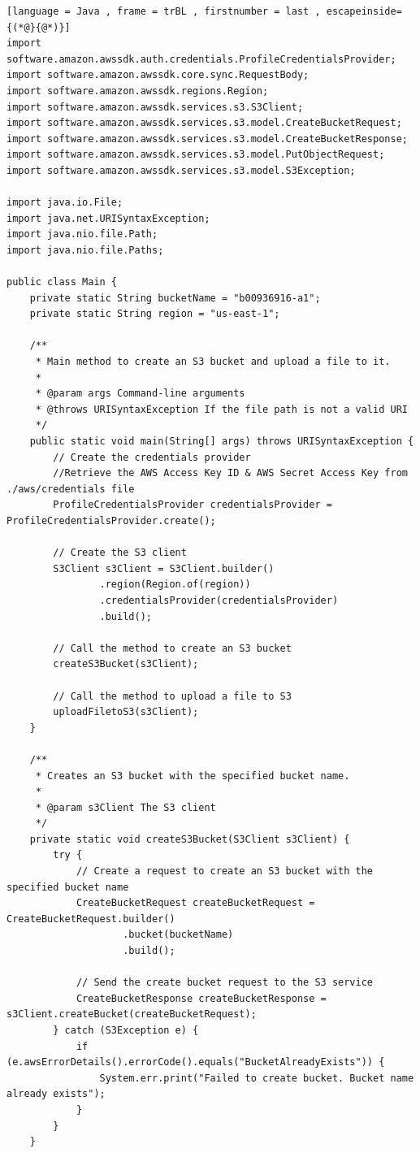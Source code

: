 \begin{itemize}
\begin{lstlisting}[language = Java , frame = trBL , firstnumber = last , escapeinside={(*@}{@*)}]
import software.amazon.awssdk.auth.credentials.ProfileCredentialsProvider;
import software.amazon.awssdk.core.sync.RequestBody;
import software.amazon.awssdk.regions.Region;
import software.amazon.awssdk.services.s3.S3Client;
import software.amazon.awssdk.services.s3.model.CreateBucketRequest;
import software.amazon.awssdk.services.s3.model.CreateBucketResponse;
import software.amazon.awssdk.services.s3.model.PutObjectRequest;
import software.amazon.awssdk.services.s3.model.S3Exception;

import java.io.File;
import java.net.URISyntaxException;
import java.nio.file.Path;
import java.nio.file.Paths;

public class Main {
    private static String bucketName = "b00936916-a1";
    private static String region = "us-east-1";

    /**
     * Main method to create an S3 bucket and upload a file to it.
     *
     * @param args Command-line arguments
     * @throws URISyntaxException If the file path is not a valid URI
     */
    public static void main(String[] args) throws URISyntaxException {
        // Create the credentials provider
        //Retrieve the AWS Access Key ID & AWS Secret Access Key from ./aws/credentials file
        ProfileCredentialsProvider credentialsProvider = ProfileCredentialsProvider.create();

        // Create the S3 client
        S3Client s3Client = S3Client.builder()
                .region(Region.of(region))
                .credentialsProvider(credentialsProvider)
                .build();

        // Call the method to create an S3 bucket
        createS3Bucket(s3Client);

        // Call the method to upload a file to S3
        uploadFiletoS3(s3Client);
    }

    /**
     * Creates an S3 bucket with the specified bucket name.
     *
     * @param s3Client The S3 client
     */
    private static void createS3Bucket(S3Client s3Client) {
        try {
            // Create a request to create an S3 bucket with the specified bucket name
            CreateBucketRequest createBucketRequest = CreateBucketRequest.builder()
                    .bucket(bucketName)
                    .build();

            // Send the create bucket request to the S3 service
            CreateBucketResponse createBucketResponse = s3Client.createBucket(createBucketRequest);
        } catch (S3Exception e) {
            if (e.awsErrorDetails().errorCode().equals("BucketAlreadyExists")) {
                System.err.print("Failed to create bucket. Bucket name already exists");
            }
        }
    }


\end{lstlisting}
\end{itemize}
